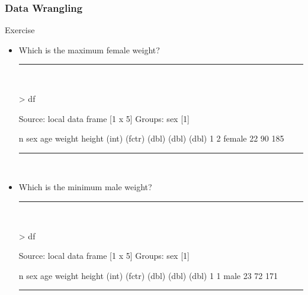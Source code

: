 \documentclass{beamer}
\begin{document}
\begin{frame}[fragile]
	\frametitle{Data Wrangling}
	\centering \LARGE Exercise
	\begin{itemize}
		\small
		\item Which is the maximum female weight? 
\rule{\textwidth}{0.4pt}\\
\tiny
\setlength{\fancyvrbtopsep}{-1pt}
\setlength{\fancyvrbpartopsep}{-1pt}
\begin{Schunk}
\begin{Sinput}
> df %
\end{Sinput}
\begin{Soutput}
Source: local data frame [1 x 5]
Groups: sex [1]

      n    sex   age weight height
  (int) (fctr) (dbl)  (dbl)  (dbl)
1     2 female    22     90    185
\end{Soutput}
\end{Schunk}
\rule{\textwidth}{0.4pt}\\
\small
		\item Which is the minimum male weight? 
\rule{\textwidth}{0.4pt}\\
\tiny
\setlength{\fancyvrbtopsep}{-1pt}
\setlength{\fancyvrbpartopsep}{-1pt}
\begin{Schunk}
\begin{Sinput}
> df %
\end{Sinput}
\begin{Soutput}
Source: local data frame [1 x 5]
Groups: sex [1]

      n    sex   age weight height
  (int) (fctr) (dbl)  (dbl)  (dbl)
1     1   male    23     72    171
\end{Soutput}
\end{Schunk}
\rule{\textwidth}{0.4pt}\\
\small
\end{itemize}
\end{frame}
\end{document}
